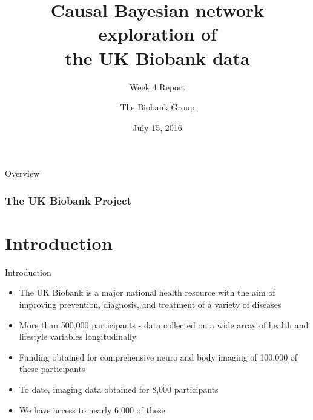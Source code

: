 \documentclass[10pt]{beamer} %
\title{Causal Bayesian network exploration of \\ the UK Biobank data}
\subtitle{Week 4 Report}
\author[The Biobank Group]{The Biobank Group}
\institute[ATI]{The Alan Turing Institute}
\date{July 15, 2016}
\begin{document}
\begin{frame}[plain]
  \titlepage
\end{frame}
\begin{frame}[plain]{Overview}
 \frametitle{The UK Biobank Project}
    \tableofcontents
\end{frame}
\section{Introduction}
\begin{frame}[plain]{Introduction}

\begin{itemize}

\item The UK Biobank is a major national health resource with the aim of improving prevention, diagnosis, and treatment of a variety of diseases

\item More than 500,000 participants - data collected on a wide array of health and lifestyle variables longitudinally

\item Funding obtained for comprehensive neuro and body imaging of 100,000 of these participants

\item To date, imaging data obtained for 8,000 participants 

\item We have access to nearly 6,000 of these


\end{itemize}


\end{frame}

\end{document}
